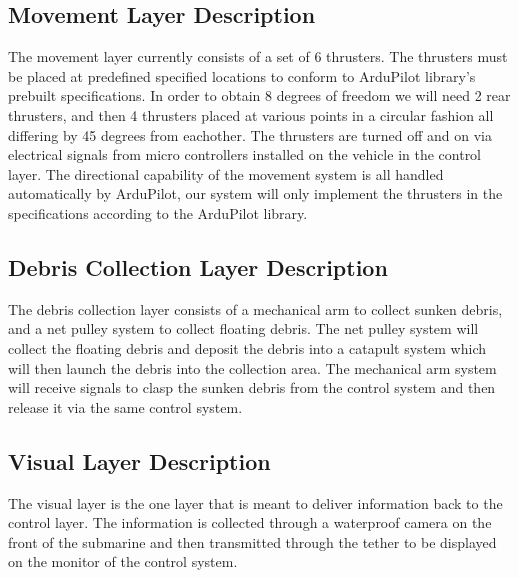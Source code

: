 \subsection{Movement Layer Description}
The movement layer currently consists of a set of 6 thrusters. The thrusters must be placed at predefined specified locations to conform to ArduPilot library's prebuilt specifications. In order to obtain 8 degrees of freedom we will need 2 rear thrusters, and then 4 thrusters placed at various points in a circular fashion all differing by 45 degrees from eachother. The thrusters are turned off and on via electrical signals from micro controllers installed on the vehicle in the control layer. The directional capability of the movement system is all handled automatically by ArduPilot, our system will only implement the thrusters in the specifications according to the ArduPilot library.

\subsection{Debris Collection Layer Description}
The debris collection layer consists of a mechanical arm to collect sunken debris, and a net pulley system to collect floating debris. The net pulley system will collect the floating debris and deposit the debris into a catapult system which will then launch the debris into the collection area. The mechanical arm system will receive signals to clasp the sunken debris from the control system and then release it via the same control system.

\subsection{Visual Layer Description}
The visual layer is the one layer that is meant to deliver information back to the control layer. The information is collected through a waterproof camera on the front of the submarine and then transmitted through the tether to be displayed on the monitor of the control system.  